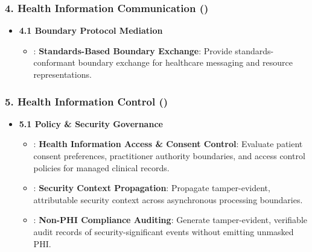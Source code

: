 \subsubsection*{4. Health Information Communication (\texttt{})}
\label{rad:enabling:627}

\begin{itemize}

\item 
\textbf{4.1 Boundary Protocol Mediation}


\begin{itemize}

\item 
\texttt{}: \textbf{Standards-Based Boundary Exchange}: Provide standards-conformant boundary exchange for healthcare messaging and resource representations.



\end{itemize}


\end{itemize}
\label{rad:enabling:630}
\subsubsection*{5. Health Information Control (\texttt{})}
\label{rad:enabling:631}

\begin{itemize}

\item 
\textbf{5.1 Policy \& Security Governance}


\begin{itemize}

\item 
\texttt{}: \textbf{Health Information Access \& Consent Control}: Evaluate patient consent preferences, practitioner authority boundaries, and access control policies for managed clinical records.



\item 
\texttt{}: \textbf{Security Context Propagation}: Propagate tamper-evident, attributable security context across asynchronous processing boundaries.



\item 
\texttt{}: \textbf{Non-PHI Compliance Auditing}: Generate tamper-evident, verifiable audit records of security-significant events without emitting unmasked PHI.



\end{itemize}


\end{itemize}
\label{rad:enabling:636}
